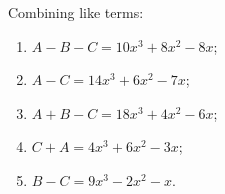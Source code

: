 Combining like terms:
\begin{enumerate}
\item[(a)] $A-B-C=\boxed{10x^3+8x^2-8x}$;
\item[(b)] $A-C=\boxed{14x^3+6x^2-7x}$;
\item[(c)] $A+B-C=\boxed{18x^3+4x^2-6x}$;
\item[(d)] $C+A=\boxed{4x^3+6x^2-3x}$;
\item[(e)] $B-C=\boxed{9x^3-2x^2-x}$.
\end{enumerate}
